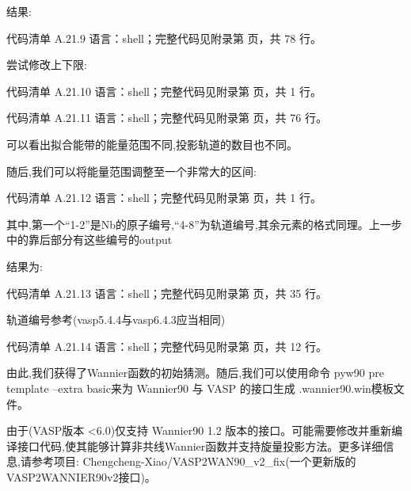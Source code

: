 \documentclass[lang=cn,scheme=chinese,color=blue,device=normal,toc=onecol,math=cm]{elegantbook}
\begin{document}
结果:\par


\begin{codeindexbox}{代码清单 A.21.9}
语言：shell；完整代码见附录第 \pageref{code:21:9} 页，共 78 行。
\end{codeindexbox}


尝试修改上下限:\par


\begin{codeindexbox}{代码清单 A.21.10}
语言：shell；完整代码见附录第 \pageref{code:21:10} 页，共 1 行。
\end{codeindexbox}


\begin{codeindexbox}{代码清单 A.21.11}
语言：shell；完整代码见附录第 \pageref{code:21:11} 页，共 76 行。
\end{codeindexbox}


可以看出拟合能带的能量范围不同,投影轨道的数目也不同。\par


随后,我们可以将能量范围调整至一个非常大的区间:\par


\begin{codeindexbox}{代码清单 A.21.12}
语言：shell；完整代码见附录第 \pageref{code:21:12} 页，共 1 行。
\end{codeindexbox}


其中,第一个“1-2”是Nb的原子编号,“4-8”为轨道编号,其余元素的格式同理。上一步中的靠后部分有这些编号的output\par


结果为:\par


\begin{codeindexbox}{代码清单 A.21.13}
语言：shell；完整代码见附录第 \pageref{code:21:13} 页，共 35 行。
\end{codeindexbox}


轨道编号参考(vasp5.4.4与vasp6.4.3应当相同)\par


\begin{codeindexbox}{代码清单 A.21.14}
语言：shell；完整代码见附录第 \pageref{code:21:14} 页，共 12 行。
\end{codeindexbox}


由此,我们获得了Wannier函数的初始猜测。随后,我们可以使用命令 pyw90 pre template –extra basic来为 Wannier90 与 VASP 的接口生成 .wannier90.win模板文件。\par


由于(VASP版本 <6.0)仅支持 Wannier90 1.2 版本的接口。可能需要修改并重新编译接口代码,使其能够计算非共线Wannier函数并支持旋量投影方法。更多详细信息,请参考项目: Chengcheng-Xiao/\allowbreak{}VASP2WAN90\_\allowbreak{}v2\_\allowbreak{}fix(一个更新版的VASP2WANNIER90v2接口)。\par
\end{document}

